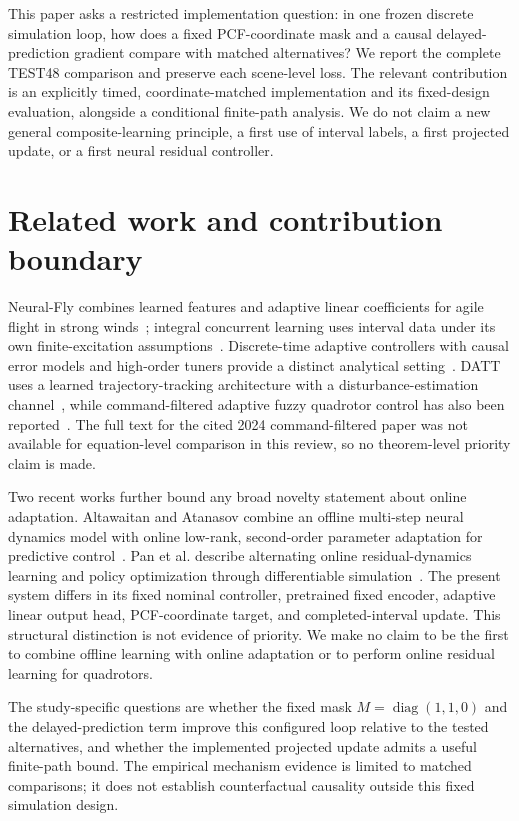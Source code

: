 \documentclass[11pt]{article}
\begin{document}
This paper asks a restricted implementation question: in one frozen discrete simulation loop, how does a fixed PCF-coordinate mask and a causal delayed-prediction gradient compare with matched alternatives? We report the complete TEST48 comparison and preserve each scene-level loss. The relevant contribution is an explicitly timed, coordinate-matched implementation and its fixed-design evaluation, alongside a conditional finite-path analysis. We do not claim a new general composite-learning principle, a first use of interval labels, a first projected update, or a first neural residual controller.

\section{Related work and contribution boundary}
Neural-Fly combines learned features and adaptive linear coefficients for agile flight in strong winds~\cite{oconnell2022neuralfly}; integral concurrent learning uses interval data under its own finite-excitation assumptions~\cite{parikh2019integral}. Discrete-time adaptive controllers with causal error models and high-order tuners provide a distinct analytical setting~\cite{fisher2023discrete}. DATT uses a learned trajectory-tracking architecture with a disturbance-estimation channel~\cite{huang2023datt}, while command-filtered adaptive fuzzy quadrotor control has also been reported~\cite{zhao2024commandfilter}. The full text for the cited 2024 command-filtered paper was not available for equation-level comparison in this review, so no theorem-level priority claim is made.

Two recent works further bound any broad novelty statement about online adaptation. Altawaitan and Atanasov combine an offline multi-step neural dynamics model with online low-rank, second-order parameter adaptation for predictive control~\cite{altawaitan2026adapting}. Pan et al. describe alternating online residual-dynamics learning and policy optimization through differentiable simulation~\cite{pan2026learningfly}. The present system differs in its fixed nominal controller, pretrained fixed encoder, adaptive linear output head, PCF-coordinate target, and completed-interval update. This structural distinction is not evidence of priority. We make no claim to be the first to combine offline learning with online adaptation or to perform online residual learning for quadrotors.

The study-specific questions are whether the fixed mask $M=\operatorname{diag}(1,1,0)$ and the delayed-prediction term improve this configured loop relative to the tested alternatives, and whether the implemented projected update admits a useful finite-path bound. The empirical mechanism evidence is limited to matched comparisons; it does not establish counterfactual causality outside this fixed simulation design.
\end{document}
